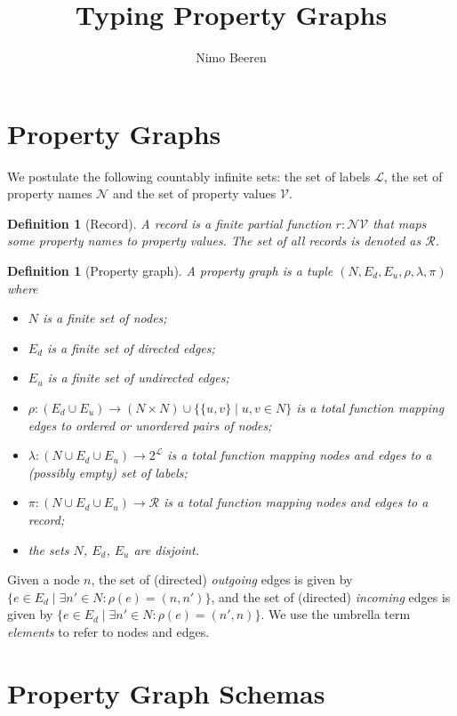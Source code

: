 \documentclass[a4paper]{article}
\title{Typing Property Graphs}
\author{Nimo Beeren}
\makeatletter
\newtheorem{definition}[theorem]{Definition}
\newcommand{\pto}{}%
\DeclareRobustCommand{\pto}{\mathrel{\mathpalette\p@to@gets\to}}
\newcommand{\p@to@gets}[2]{%
  \ooalign{\hidewidth$\m@th#1\mapstochar\mkern5mu$\hidewidth\cr$\m@th#1\to$\cr}%
}
\makeatother
\begin{document}
\section{Property Graphs}

We postulate the following countably infinite sets: the set of labels $\mathcal{L}$, the set of property names $\mathcal{N}$ and the set of property values $\mathcal{V}$.

\begin{definition}[Record]
  A \emph{record} is a finite partial function $r : \mathcal{N} \pto \mathcal{V}$ that maps some property names to property values. The set of all records is denoted as $\mathcal{R}$.
\end{definition}

\begin{definition}[Property graph]
  A \emph{property graph} is a tuple $(N, E_d, E_u, \rho, \lambda, \pi)$ where
  \begin{itemize}
    \item $N$ is a finite set of nodes;
    \item $E_d$ is a finite set of directed edges;
    \item $E_u$ is a finite set of undirected edges;
    \item $\rho : (E_d \cup E_u) \to (N \times N) \cup \{\{u, v\} \mid u, v \in N\}$ is a total function mapping edges to  ordered or unordered pairs of nodes;
    \item $\lambda : (N \cup E_d \cup E_u) \to 2^{\mathcal{L}}$ is a total function mapping nodes and edges to a (possibly empty) set of labels;
    \item $\pi : (N \cup E_d \cup E_u) \to \mathcal{R}$ is a total function mapping nodes and edges to a record;
    \item the sets $N$, $E_d$, $E_u$ are disjoint.
  \end{itemize}
\end{definition}

Given a node $n$, the set of (directed) \emph{outgoing} edges is given by $\{e \in E_d \mid \exists n' \in N : \rho(e) = (n, n')\}$, and the set of (directed) \emph{incoming} edges is given by $\{e \in E_d \mid \exists n' \in N : \rho(e) = (n', n)\}$. We use the umbrella term \emph{elements} to refer to nodes and edges.

\section{Property Graph Schemas}
\end{document}
